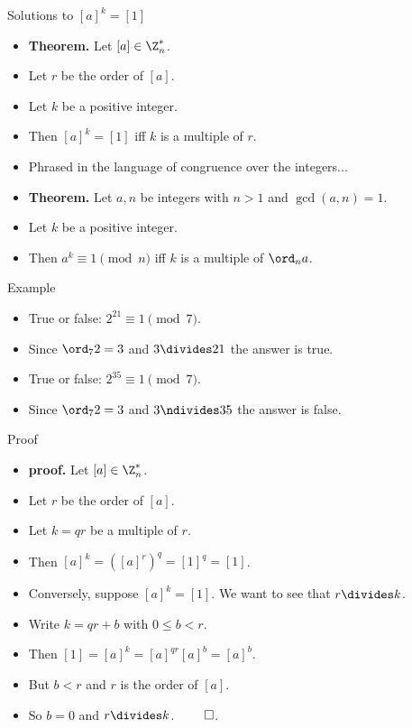 \documentclass{beamer}
\begin{document}
\begin{frame}{Solutions to $[a]^k = [1]$}

\begin{itemize}
  \item \textbf{Theorem.} Let $[a]\in\Z^*_n$.
  \item Let $r$ be the order of $[a]$.
  \item Let $k$ be a positive integer.
  \item Then $[a]^k = [1]$ iff $k$ is a multiple of $r$.
  \item Phrased in the language of congruence over the integers...
  \item \textbf{Theorem.} Let $a,n$ be integers with $n>1$ and $\gcd(a,n)=1$.
  \item Let $k$ be a positive integer.
  \item Then $a^k \equiv 1 \pmod n$ iff $k$ is a multiple of $\ord_n a$.
\end{itemize}
\end{frame}

\begin{frame}{Example}

\begin{itemize}
  \item True or false: $2^{21} \equiv 1 \pmod 7$.
  \item Since $\ord_7 2 = 3$ and $3\divides 21$ the answer is true.
  \item True or false: $2^{35} \equiv 1 \pmod 7$.
  \item Since $\ord_7 2 = 3$ and $3\ndivides 35$ the answer is false.
\end{itemize}
\end{frame}

\begin{frame}{Proof}

\begin{itemize}
  \item \textbf{proof.} Let $[a]\in\Z^*_n$.
  \item Let $r$ be the order of $[a]$.
  \item Let $k=qr$ be a multiple of $r$.
  \item Then $[a]^{k} = ([a]^r)^q = [1]^q = [1]$.
  \item Conversely, suppose $[a]^k=[1]$. We want to see that $r\divides k$.
  \item Write $k=qr + b$ with $0\leq b < r$.
  \item Then $[1] = [a]^k = [a]^{qr}[a]^b = [a]^b$.
  \item But $b<r$ and $r$ is the order of $[a]$.
  \item So $b=0$ and $r\divides k$. $\qed$.
\end{itemize}
\end{frame}
\end{document}
